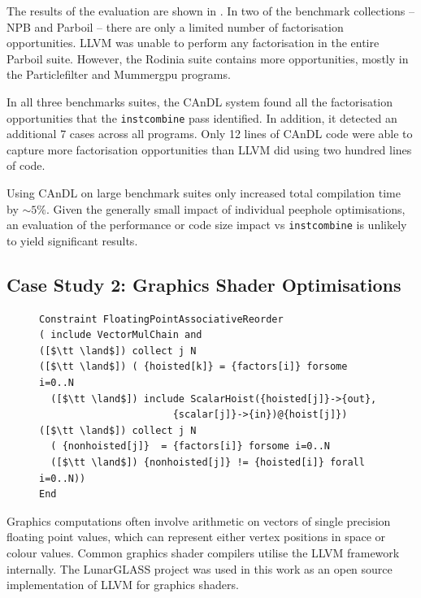     The results of the evaluation are shown in
    .
    In two of the benchmark collections -- NPB and Parboil -- there are
    only a limited number of factorisation opportunities.
    LLVM was unable to perform any factorisation in the entire Parboil suite.
    However, the Rodinia suite contains more opportunities, mostly in the
    Particlefilter and Mummergpu programs.

    In all three benchmarks suites, the CAnDL system found all the factorisation
    opportunities that the \texttt{instcombine} pass identified.
    In addition, it detected an additional 7 cases across all programs.
    Only 12 lines of CAnDL code were able to capture more factorisation
    opportunities than LLVM did using two hundred lines of code.

    Using CAnDL on large benchmark suites only increased total compilation time
    by \mbox{$\sim5\%$}.
    Given the generally small impact of individual peephole optimisations, an
    evaluation of the performance or code size impact vs {\tt instcombine} is
    unlikely to yield significant results.

\subsection{Case Study 2: Graphics Shader Optimisations}

\begin{figure}[t]
\begin{lstlisting}[language=CAnDL,label={fig:Lewis},caption=
   {CAnDL defines multiplication chains involving genuine vectors and hoisted
    scalars:
    After separating the two cases, some of the multiplications can be performed
    on scalars instead.\parfillskip=0pt}]
Constraint FloatingPointAssociativeReorder
( include VectorMulChain and
([$\tt \land$]) collect j N
([$\tt \land$]) ( {hoisted[k]} = {factors[i]} forsome i=0..N
  ([$\tt \land$]) include ScalarHoist({hoisted[j]}->{out},
                       {scalar[j]}->{in})@{hoist[j]})
([$\tt \land$]) collect j N
  ( {nonhoisted[j]}  = {factors[i]} forsome i=0..N
  ([$\tt \land$]) {nonhoisted[j]} != {hoisted[i]} forall  i=0..N))
End
\end{lstlisting}
\end{figure}

    Graphics computations often involve arithmetic on vectors of single
    precision floating point values, which can represent either vertex positions
    in space or colour values.
    Common graphics shader compilers utilise the LLVM framework internally.
    The LunarGLASS project \citep{lunarglass} was used in this work as an open
    source implementation of LLVM for graphics shaders.

